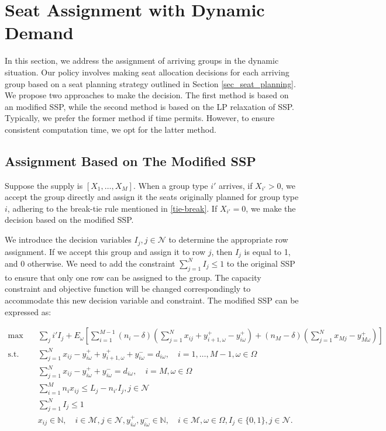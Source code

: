 \section{Seat Assignment with Dynamic Demand}\label{sec_dynamic}
In this section, we address the assignment of arriving groups in the dynamic situation. Our policy involves making seat allocation decisions for each arriving group based on a seat planning strategy outlined in Section \ref{sec_seat_planning}. We propose two approaches to make the decision. The first method is based on an modified SSP, while the second method is based on the LP relaxation of SSP. Typically, we prefer the former method if time permits. However, to ensure consistent computation time, we opt for the latter method.


\subsection{Assignment Based on The Modified SSP}
Suppose the supply is $[X_1, \ldots, X_M]$. When a group type $i{'}$ arrives, if $X_{i{'}} > 0$, we accept the group directly and assign it the seats originally planned for group type $i$, adhering to the break-tie rule mentioned in \ref{tie-break}. If $X_{i{'}} = 0$, we make the decision based on the modified SSP.

We introduce the decision variables $I_j, j \in \mathcal{N}$ to determine the appropriate row assignment. If we accept this group and assign it to row $j$, then $I_j$ is equal to 1, and 0 otherwise. We need to add the constraint $\sum_{j=1}^{N} I_j \leq 1$ to the original SSP to ensure that only one row can be assigned to the group. The capacity constraint and objective function will be changed correspondingly to accommodate this new decision variable and constraint. The modified SSP can be expressed as:

\begin{equation}\label{modified_SSP}
  \begin{aligned}
  \max \quad & \sum_{j} i{'} I_j + E_{\omega}\left[\sum_{i=1}^{M-1} (n_i-\delta) (\sum_{j= 1}^{N} x_{ij} + y_{i+1,\omega}^{+} - y_{i \omega}^{+}) + (n_{M}-\delta) (\sum_{j= 1}^{N} x_{Mj} - y_{M \omega}^{+})\right] \\
  \text {s.t.} \quad & \sum_{j= 1}^{N} x_{ij}-y_{i \omega}^{+}+
  y_{i+1, \omega}^{+} + y_{i \omega}^{-}=d_{i \omega}, \quad i = 1,\ldots,M-1, \omega \in \Omega \\
  & \sum_{j= 1}^{N} x_{ij} -y_{i \omega}^{+}+y_{i \omega}^{-}=d_{i \omega}, \quad i = M, \omega \in \Omega \\
  & \sum_{i=1}^{M} n_{i} x_{ij} \leq L_j - n_{i{'}} I_j, j \in \mathcal{N} \\
  & \sum_{j=1}^{N} I_j \leq 1 \\
  & x_{ij} \in \mathbb{N}, \quad i \in \mathcal{M}, j \in \mathcal{N}, y_{i \omega}^{+}, y_{i \omega}^{-} \in \mathbb{N}, \quad i \in \mathcal{M}, \omega \in \Omega,  I_j \in \{0,1\}, j \in \mathcal{N}.
  \end{aligned}
\end{equation}


